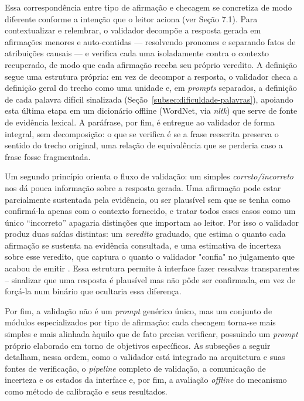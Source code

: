 Essa correspondência entre tipo de afirmação e checagem se concretiza de modo diferente conforme a intenção que o leitor aciona (ver Seção 7.1). Para contextualizar e relembrar, o validador decompõe a resposta gerada em afirmações menores e auto-contidas --- resolvendo pronomes e separando fatos de atribuições causais --- e verifica cada uma isoladamente contra o contexto recuperado, de modo que cada afirmação receba seu próprio veredito. A definição segue uma estrutura própria: em vez de decompor a resposta, o validador checa a definição geral do trecho como uma unidade e, em \textit{prompts} separados, a definição de cada palavra difícil sinalizada (Seção~\ref{subsec:dificuldade-palavras}), apoiando esta última etapa em um dicionário offline (WordNet, via \textit{nltk}) que serve de fonte de evidência lexical. A paráfrase, por fim, é entregue ao validador de forma integral, sem decomposição: o que se verifica é se a frase reescrita preserva o sentido do trecho original, uma relação de equivalência que se perderia caso a frase fosse fragmentada.

Um segundo princípio orienta o fluxo de validação: um simples \textit{correto/incorreto} nos dá pouca informação sobre a resposta gerada. Uma afirmação pode estar parcialmente sustentada pela evidência, ou ser plausível sem que se tenha como confirmá-la apenas com o contexto fornecido, e tratar todos esses casos como um único ``incorreto'' apagaria distinções que importam ao leitor. Por isso o validador produz duas saídas distintas: um \textit{veredito} graduado, que estima o quanto cada afirmação se sustenta na evidência consultada, e uma estimativa de incerteza sobre esse veredito, que captura o quanto o validador "confia" no julgamento que acabou de emitir \cite{liu2025uncertainty,kadavath2022language}. Essa estrutura permite à interface fazer ressalvas transparentes -- sinalizar que uma resposta é plausível mas não pôde ser confirmada, em vez de forçá-la num binário que ocultaria essa diferença. 

Por fim, a validação não é um \textit{prompt} genérico único, mas um conjunto de módulos especializados por tipo de afirmação: cada checagem torna-se mais simples e mais alinhada àquilo que de fato precisa verificar, possuindo um \textit{prompt} próprio elaborado em torno de objetivos específicos. As subseções a seguir detalham, nessa ordem, como o validador está integrado na arquitetura e suas fontes de verificação, o \textit{pipeline} completo de validação, a comunicação de incerteza e os estados da interface e, por fim, a avaliação \textit{offline} do mecanismo como método de calibração e seus resultados.

